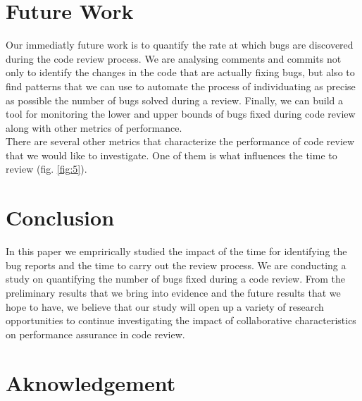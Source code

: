 \documentclass[ifip]{svmult}
\begin{document}
\section{Future Work}
\label{sec:7} 

Our immediatly future work is to quantify the rate at which bugs are discovered during the code review process.
We are analysing comments and commits not only to identify the changes in the code that are actually fixing bugs, 
but also to find patterns that we can use to automate the process of individuating as precise as possible 
the number of bugs solved during a review. Finally, we can build a tool for monitoring the 
lower and upper bounds of bugs fixed during code review along with other metrics of performance.
\\
There are several other metrics that characterize the 
performance of code review that we would like to investigate. One of them is what influences the time to review 
(fig. \ref{fig:5}).

\section{Conclusion}
\label{sec:8} 

In this paper we emprirically studied the impact of the time for identifying the bug reports and the time to carry out
the review process. We are conducting a study on quantifying the number of bugs fixed during a code review. 
From the preliminary results that we bring into evidence and the future results that we hope to have, we believe that 
our study will open up a variety of research opportunities to continue investigating the impact of collaborative 
characteristics on performance assurance in code review.   

\section{Aknowledgement}
\end{document}
